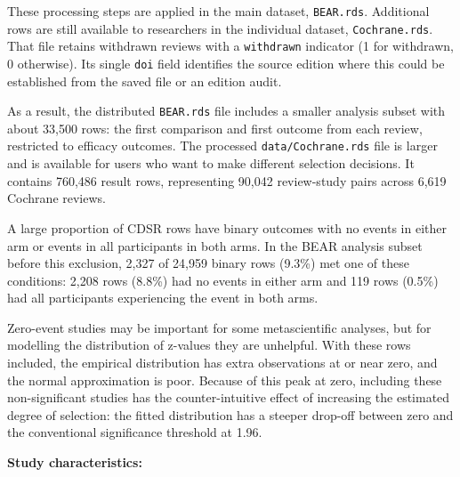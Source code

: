 \documentclass[
  11pt,
]{article}
\begin{document}
These processing steps are applied in the main dataset,
\texttt{BEAR.rds}. Additional rows are still available to researchers in
the individual dataset, \texttt{Cochrane.rds}. That file retains
withdrawn reviews with a \texttt{withdrawn} indicator (1 for withdrawn,
0 otherwise). Its single \texttt{doi} field identifies the source
edition where this could be established from the saved file or an
edition audit.

As a result, the distributed \texttt{BEAR.rds} file includes a smaller
analysis subset with about 33,500 rows: the first comparison and first
outcome from each review, restricted to efficacy outcomes. The processed
\texttt{data/Cochrane.rds} file is larger and is available for users who
want to make different selection decisions. It contains 760,486 result
rows, representing 90,042 review-study pairs across 6,619 Cochrane
reviews.

A large proportion of CDSR rows have binary outcomes with no events in
either arm or events in all participants in both arms. In the BEAR
analysis subset before this exclusion, 2,327 of 24,959 binary rows
(9.3\%) met one of these conditions: 2,208 rows (8.8\%) had no events in
either arm and 119 rows (0.5\%) had all participants experiencing the
event in both arms.

Zero-event studies may be important for some metascientific analyses,
but for modelling the distribution of z-values they are unhelpful. With
these rows included, the empirical distribution has extra observations
at or near zero, and the normal approximation is poor. Because of this
peak at zero, including these non-significant studies has the
counter-intuitive effect of increasing the estimated degree of
selection: the fitted distribution has a steeper drop-off between zero
and the conventional significance threshold at 1.96.

\textbf{Study characteristics:}
\end{document}
